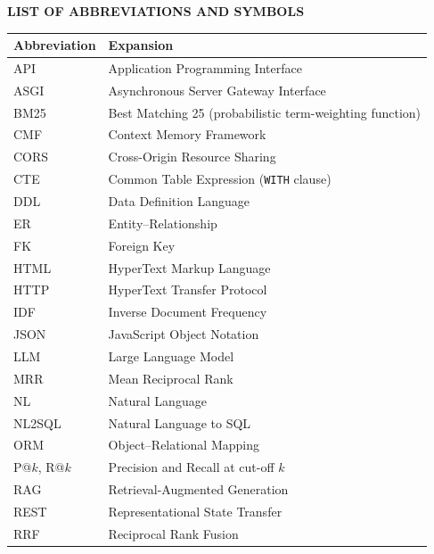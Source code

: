 \newpage
{}
\begin{center}
    {\fontsize{16}{24}\selectfont \textbf{LIST OF ABBREVIATIONS AND SYMBOLS}\\}
\end{center}
\vspace{0.8cm}

\begin{longtable}{p{3.5cm} p{10cm}}
    \toprule
    \textbf{Abbreviation} & \textbf{Expansion} \\
    \midrule
    \endhead
    API     & Application Programming Interface \\[2pt]
    ASGI    & Asynchronous Server Gateway Interface \\[2pt]
    BM25    & Best Matching 25 (probabilistic term-weighting function) \\[2pt]
    CMF     & Context Memory Framework \\[2pt]
    CORS    & Cross-Origin Resource Sharing \\[2pt]
    CTE     & Common Table Expression (\texttt{WITH} clause) \\[2pt]
    DDL     & Data Definition Language \\[2pt]
    ER      & Entity--Relationship \\[2pt]
    FK      & Foreign Key \\[2pt]
    HTML    & HyperText Markup Language \\[2pt]
    HTTP    & HyperText Transfer Protocol \\[2pt]
    IDF     & Inverse Document Frequency \\[2pt]
    JSON    & JavaScript Object Notation \\[2pt]
    LLM     & Large Language Model \\[2pt]
    MRR     & Mean Reciprocal Rank \\[2pt]
    NL      & Natural Language \\[2pt]
    NL2SQL  & Natural Language to SQL \\[2pt]
    ORM     & Object--Relational Mapping \\[2pt]
    P@$k$, R@$k$ & Precision and Recall at cut-off $k$ \\[2pt]
    RAG     & Retrieval-Augmented Generation \\[2pt]
    REST    & Representational State Transfer \\[2pt]
    RRF     & Reciprocal Rank Fusion \\[2pt]

\end{longtable}
